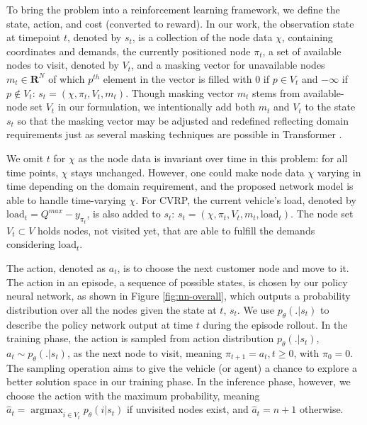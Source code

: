 \documentclass{article}
\DeclareMathOperator*{\argmax}{argmax}
\begin{document}
To bring the problem into a reinforcement learning framework, we define the state, action, and cost (converted to reward). In our work, the observation state at timepoint $t$, denoted by $s_t$, is a collection of the node data $\chi$, containing coordinates and demands, the currently positioned node $\pi_t$, a set of available nodes to visit, denoted by $V_t$, and a masking vector for unavailable nodes $m_t \in \mathbf{R}^N$ of which $p^{th}$ element in the vector is filled with $0$ if $p \in V_t$ and $-\infty$ if $p \notin V_t$: $s_t = (\chi, \pi_t, V_t, m_t)$.
Though masking vector $m_t$ stems from available-node set $V_t$ in our formulation, we intentionally add both $m_t$ and $V_t$ to the state $s_t$ so that the masking vector may be adjusted and redefined reflecting domain requirements just as several masking techniques are possible in Transformer \cite{masked_attention, vaswaniAttentionAllYou2017, masked_attention2}  .

We omit $t$ for $\chi$ as the node data is invariant over time in this problem: for all time points, $\chi$ stays unchanged. However, one could make node data $\chi$ varying in time depending on the domain requirement, and the proposed network model is able to handle time-varying $\chi$.
For CVRP, the current vehicle's load, denoted by $\mbox{load}_t = Q^{max} - y_{\pi_t}$, is also added to $s_t$: $s_t = (\chi, \pi_t,  V_t, m_t, \mbox{load}_t)$.
The node set $V_t \subset V$ holds nodes, not visited yet, that are able to fulfill the demands considering $\mbox{load}_t$.

The action, denoted as $a_t$, is to choose the next customer node and move to it. The action in an episode, a sequence of possible states, is chosen by our policy neural network, as shown in Figure \ref{fig:nn-overall}, which outputs a probability distribution over all the nodes given the state at $t$, $s_t$. We use $p_\theta(.|s_t)$ to describe the policy network output at time $t$ during the episode rollout. In the training phase, the action is sampled from action distribution $p_\theta(.|s_{t})$, $a_{t} \sim p_\theta(.|s_{t})$, as the next node to visit, meaning $\pi_{t+1}=a_t, t \ge 0$, with $\pi_0 = 0$. The sampling operation aims to give the vehicle (or agent) a chance to explore a better solution space in our training phase. In the inference phase, however, we choose the action with the maximum probability, meaning $\hat{a}_{t} = \argmax_{i \in V_t}{p_\theta(i|s_t)}$ if unvisited nodes exist, and $\hat{a}_{t} = n+1$ otherwise.
\end{document}
